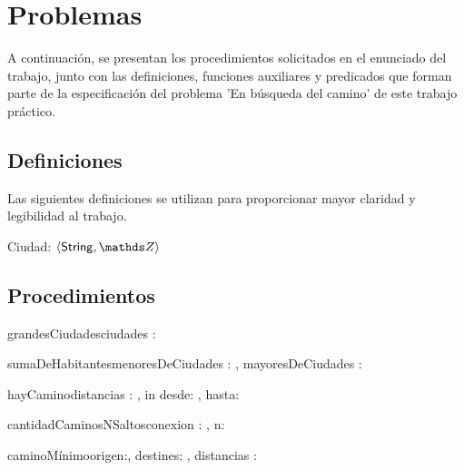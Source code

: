 \documentclass[10pt,a4paper]{article}
\newcommand{\ciudad}{\ensuremath{\langle \mathsf{String} , \ent \rangle}}
\begin{document}
\maketitle

\section{Problemas}
A continuación, se presentan los procedimientos solicitados en el enunciado del trabajo, junto con las definiciones, funciones auxiliares y predicados que forman parte de la especificación del problema 'En búsqueda del camino' de este trabajo práctico.

\subsection{Definiciones}
Las siguientes definiciones se utilizan para proporcionar mayor claridad y legibilidad al trabajo.

Ciudad:   \ciudad


\subsection{Procedimientos}


\begin{proc}{grandesCiudades}{\In ciudades : }{ }
\end{proc}

\begin{proc}{sumaDeHabitantes}{\In menoresDeCiudades : , \In mayoresDeCiudades : }{ }
\end{proc}

\begin{proc}{hayCamino}{\In distancias : \TLista{\TLista{\ent}}, in desde: \ent, hasta: \ent}{ \bool}
\end{proc}

\begin{proc}{cantidadCaminosNSaltos}{\Inout conexion : \TLista{\TLista{\ent}}, \In n: \ent}{}
\end{proc}


\begin{proc}{caminoMínimo}{\In origen:\ent , \In destines: \ent , \In distancias : \TLista{\TLista{\ent}}}{ \TLista{\ent}}
\end{proc}
\end{document}
